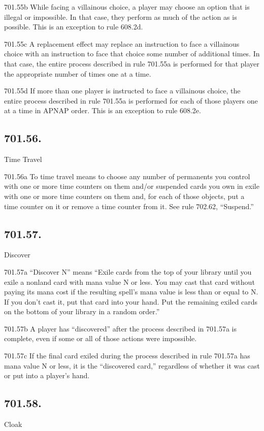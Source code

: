 701.55b While facing a villainous choice, a player may choose an option that is illegal or impossible. In that case, they perform as much of the action as is possible. This is an exception to rule 608.2d.

701.55c A replacement effect may replace an instruction to face a villainous choice with an instruction to face that choice some number of additional times. In that case, the entire process described in rule 701.55a is performed for that player the appropriate number of times one at a time.

701.55d If more than one player is instructed to face a villainous choice, the entire process described in rule 701.55a is performed for each of those players one at a time in APNAP order. This is an exception to rule 608.2e.

\subsection*{701.56.}
Time Travel

701.56a To time travel means to choose any number of permanents you control with one or more time counters on them and/or suspended cards you own in exile with one or more time counters on them and, for each of those objects, put a time counter on it or remove a time counter from it. See rule 702.62, “Suspend.”

\subsection*{701.57.}
Discover

701.57a “Discover N” means “Exile cards from the top of your library until you exile a nonland card with mana value N or less. You may cast that card without paying its mana cost if the resulting spell’s mana value is less than or equal to N. If you don’t cast it, put that card into your hand. Put the remaining exiled cards on the bottom of your library in a random order.”

701.57b A player has “discovered” after the process described in 701.57a is complete, even if some or all of those actions were impossible.

701.57c If the final card exiled during the process described in rule 701.57a has mana value N or less, it is the “discovered card,” regardless of whether it was cast or put into a player’s hand.

\subsection*{701.58.}
Cloak

